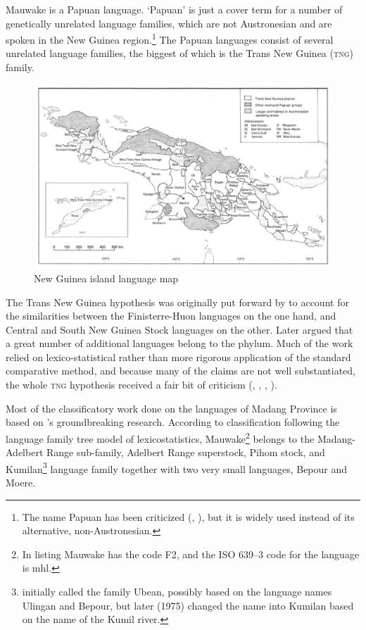 Mauwake is a Papuan language. `Papuan' is just a cover term for a number of genetically unrelated language families, which are not Austronesian and are spoken in the New Guinea region.\footnote{The name Papuan has been criticized (\citealt{Capell1969}, \citealt{Haiman1979}), but it is widely used instead of its alternative, non-Austronesian.} The Papuan languages consist of several unrelated language families, the biggest of which is the Trans New Guinea (\textsc{tng}) family.  


\begin{figure}
\caption{New Guinea island language map \citep[34 Map~2]{Ross2005}}
\label{map:2:NewGuineamap}
\includegraphics[width=\textwidth]{figures/1-new_guinea_island_language_map.jpeg}
\end{figure}

The Trans New Guinea hypothesis was originally put forward by \citet{McElhanonEtAL1970} to account for the similarities between the Finisterre-Huon languages on the one hand, and Central and South New Guinea Stock languages on the other. Later \citet{Wurm1975} argued that a great number of additional languages belong to the phylum.  Much of the work relied on lexico-statistical rather than more rigorous application of the standard comparative method, and because many of the claims are not well substantiated, the whole \textsc{tng} hypothesis received a fair bit of criticism (\citealt{Lang1976}, \citealt{Haiman1979}, \citealt{Foley1986}, \citealt{Pawley1995}).

Most of the classificatory work done on the languages of Madang Province is based on \citeauthor{ZGraggen1971}'s \citeyear{ZGraggen1971,ZGraggen1975a,ZGraggen1975b} groundbreaking research.  According to  classification following the language family tree model of lexicostatistics, Mauwake\footnote{In  listing Mauwake has the code F2, and the ISO 639--3 code for the language is mhl.} belongs to the Madang-Adelbert Range sub-family, Adelbert Range superstock, Pihom stock, and Kumilan\footnote{\citet{ZGraggen1971} initially called the family Ubean, possibly based on the language names Ulingan and Bepour, but later (1975) changed the name into Kumilan based on the name of the Kumil river.} language family together with two very small languages, Bepour and Moere. 




